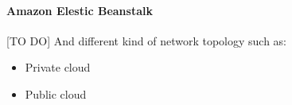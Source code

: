 \paragraph{Amazon Elestic Beanstalk}
\label{paragraph:amazon_elastic_beanstalk}
[TO DO]
And different kind of network topology such as:
\begin{itemize}
    \item Private cloud
    \item Public cloud
\end{itemize}

